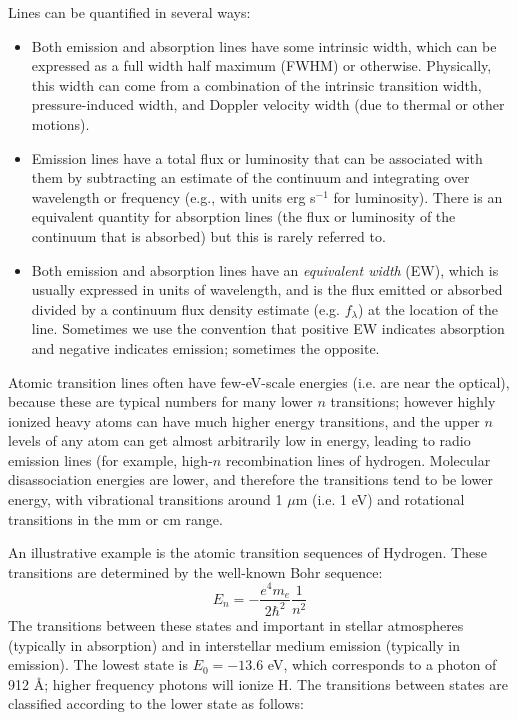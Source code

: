 Lines can be quantified in several ways:
\begin{itemize}
\item Both emission and absorption lines have some intrinsic width, which can
be expressed as a full width half maximum (FWHM) or
otherwise. Physically, this width can come from a combination of the
intrinsic transition width, pressure-induced width, and Doppler
velocity width (due to thermal or other motions).
\item Emission lines have a total flux or luminosity that can be associated
with them by subtracting an estimate of the continuum and integrating
over wavelength or frequency (e.g., with units erg s$^{-1}$ for
luminosity). There is an equivalent quantity for absorption lines (the
flux or luminosity of the continuum that is absorbed) but this is
rarely referred to.
\item Both emission and absorption lines  have an {\it equivalent
width} (EW), which is usually expressed in units of wavelength, and is
the flux emitted or absorbed divided by a continuum flux density
estimate (e.g. $f_\lambda$) at the location of the line. Sometimes we
use the convention that positive EW indicates absorption and negative
indicates emission; sometimes the opposite.
\end{itemize}

Atomic transition lines often have few-eV-scale energies (i.e. are
near the optical), because these are typical numbers for many lower
$n$ transitions; however highly ionized heavy atoms can have much
higher energy transitions, and the upper $n$ levels of any atom can
get almost arbitrarily low in energy, leading to radio emission lines
(for example, high-$n$ recombination lines of hydrogen. Molecular
disassociation energies are lower, and therefore the transitions tend
to be lower energy, with vibrational transitions around 1 $\mu$m (i.e.
1 eV) and rotational transitions in the mm or cm range.

An illustrative example is the atomic transition sequences of
Hydrogen. These transitions are determined by the well-known Bohr
sequence:
\begin{equation}
E_n = - \frac{e^4m_e}{2\hbar^2} \frac{1}{n^2}
\end{equation}
The transitions between these states and important in stellar
atmospheres (typically in absorption) and in interstellar medium
emission (typically in emission). The lowest state is $E_0 = - 13.6$
eV, which corresponds to a photon of 912 \AA; higher frequency photons
will ionize H. The transitions between states are classified
according to the lower state as follows:

